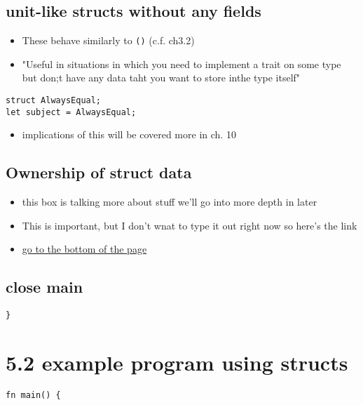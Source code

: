 \documentclass[11pt]{article}
\begin{document}
\subsection{unit-like structs without any fields}
\label{sec:org16da983}
\begin{itemize}
\item These behave similarly to \texttt{()} (c.f. ch3.2)
\item "Useful in situations in which you need to implement a trait on some type but don;t have any data taht you want to store inthe type itself"
\end{itemize}
\begin{verbatim}
struct AlwaysEqual;
let subject = AlwaysEqual;
\end{verbatim}
\begin{itemize}
\item implications of this will be covered more in ch. 10
\end{itemize}
\subsection{Ownership of struct data}
\label{sec:orgdea9345}
\begin{itemize}
\item this box is talking more about stuff we'll go into more depth in later
\item This is important, but I don't wnat to type it out right now so here's the link
\item \href{https://doc.rust-lang.org/book/ch05-01-defining-structs.html\#creating-instances-from-other-instances-with-struct-update-syntax}{go to the bottom of the page}
\end{itemize}
\subsection{close main}
\label{sec:orgb34faba}
\begin{verbatim}
}
\end{verbatim}
\section{5.2 example program using structs}
\label{sec:org23be68c}
\begin{verbatim}
fn main() {

\end{verbatim}
\end{document}
